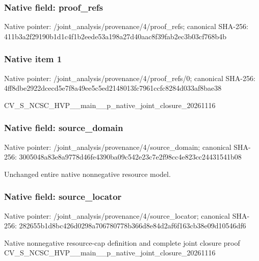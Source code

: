 \documentclass[10pt,a4paper]{article}
\begin{document}
\subsubsection{Native field: proof\_\allowbreak{}refs}
Native pointer: /joint\_\allowbreak{}analysis/provenance/4/proof\_\allowbreak{}refs; canonical SHA-256: 411b3a2f29190b1d1c4f1b2eede53a198a27d40aac8f39fab2ec3b03cf768b4b

\subsubsection{Native item 1}
Native pointer: /joint\_\allowbreak{}analysis/provenance/4/proof\_\allowbreak{}refs/0; canonical SHA-256: 4ff8dbe2922dcecd5e7f8a49ee5c5ed2148013fc7961ccfc8284d033af8bae38

\begingroup\raggedright\sloppy CV\_\allowbreak{}S\_\allowbreak{}NCSC\_\allowbreak{}HVP\_\allowbreak{}\_\allowbreak{}main\_\allowbreak{}\_\allowbreak{}p\_\allowbreak{}native\_\allowbreak{}joint\_\allowbreak{}closure\_\allowbreak{}20261116\par\endgroup

\subsubsection{Native field: source\_\allowbreak{}domain}
Native pointer: /joint\_\allowbreak{}analysis/provenance/4/source\_\allowbreak{}domain; canonical SHA-256: 3005048a83e8a9778d46fe4390ba09c542e23c7e2f98cc4e823cc24431541b08

\begingroup\raggedright\sloppy Unchanged entire native nonnegative resource model.\par\endgroup

\subsubsection{Native field: source\_\allowbreak{}locator}
Native pointer: /joint\_\allowbreak{}analysis/provenance/4/source\_\allowbreak{}locator; canonical SHA-256: 282655b1d8bc426d0298a706780778b366d8e84d2af6f163cb38e09d10546df6

\begingroup\raggedright\sloppy Native nonnegative resource-cap definition and complete joint closure proof CV\_\allowbreak{}S\_\allowbreak{}NCSC\_\allowbreak{}HVP\_\allowbreak{}\_\allowbreak{}main\_\allowbreak{}\_\allowbreak{}p\_\allowbreak{}native\_\allowbreak{}joint\_\allowbreak{}closure\_\allowbreak{}20261116\par\endgroup
\end{document}

